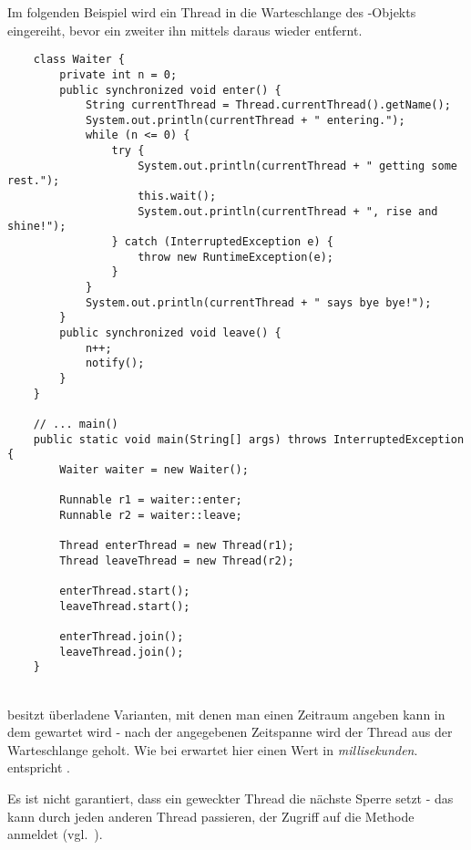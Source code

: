 \newpage
\noindent
Im folgenden Beispiel wird ein Thread in die Warteschlange des -Objekts eingereiht, bevor ein zweiter ihn mittels  daraus wieder entfernt.
\begin{verbatim}
    class Waiter {
        private int n = 0;
        public synchronized void enter() {
            String currentThread = Thread.currentThread().getName();
            System.out.println(currentThread + " entering.");
            while (n <= 0) {
                try {
                    System.out.println(currentThread + " getting some rest.");
                    this.wait();
                    System.out.println(currentThread + ", rise and shine!");
                } catch (InterruptedException e) {
                    throw new RuntimeException(e);
                }
            }
            System.out.println(currentThread + " says bye bye!");
        }
        public synchronized void leave() {
            n++;
            notify();
        }
    }

    // ... main()
    public static void main(String[] args) throws InterruptedException {
        Waiter waiter = new Waiter();

        Runnable r1 = waiter::enter;
        Runnable r2 = waiter::leave;

        Thread enterThread = new Thread(r1);
        Thread leaveThread = new Thread(r2);

        enterThread.start();
        leaveThread.start();

        enterThread.join();
        leaveThread.join();
    }
\end{verbatim}\\

\newpage
\noindent
{} besitzt überladene Varianten, mit denen man einen Zeitraum angeben kann in dem gewartet wird - nach der angegebenen Zeitspanne wird der Thread aus der Warteschlange geholt.
Wie bei  erwartet  hier einen Wert in \textit{millisekunden}.  entspricht .


\begin{tcolorbox}[enlarge top by=0.5cm,enlarge bottom by=0.5cm]
    Es ist nicht garantiert, dass ein geweckter Thread die nächste Sperre setzt - das kann durch jeden anderen Thread passieren, der Zugriff auf die Methode anmeldet (vgl.~\cite[61]{Oec22}).
\end{tcolorbox}\\

